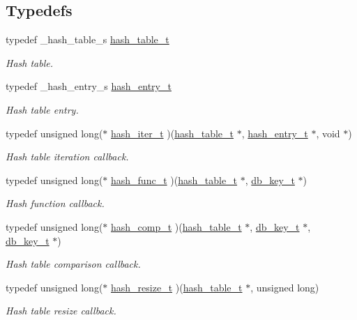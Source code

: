 \subsection*{Typedefs}
\begin{CompactItemize}
\item 
typedef \_\-hash\_\-table\_\-s \hyperlink{group__dbprim__hash_a0}{hash\_\-table\_\-t}
\begin{CompactList}\small\item\em Hash table.\item\end{CompactList}\item 
typedef \_\-hash\_\-entry\_\-s \hyperlink{group__dbprim__hash_a1}{hash\_\-entry\_\-t}
\begin{CompactList}\small\item\em Hash table entry.\item\end{CompactList}\item 
typedef unsigned long($\ast$ \hyperlink{group__dbprim__hash_a2}{hash\_\-iter\_\-t} )(\hyperlink{group__dbprim__hash_a0}{hash\_\-table\_\-t} $\ast$, \hyperlink{group__dbprim__hash_a1}{hash\_\-entry\_\-t} $\ast$, void $\ast$)
\begin{CompactList}\small\item\em Hash table iteration callback.\item\end{CompactList}\item 
typedef unsigned long($\ast$ \hyperlink{group__dbprim__hash_a3}{hash\_\-func\_\-t} )(\hyperlink{group__dbprim__hash_a0}{hash\_\-table\_\-t} $\ast$, \hyperlink{group__dbprim_a0}{db\_\-key\_\-t} $\ast$)
\begin{CompactList}\small\item\em Hash function callback.\item\end{CompactList}\item 
typedef unsigned long($\ast$ \hyperlink{group__dbprim__hash_a4}{hash\_\-comp\_\-t} )(\hyperlink{group__dbprim__hash_a0}{hash\_\-table\_\-t} $\ast$, \hyperlink{group__dbprim_a0}{db\_\-key\_\-t} $\ast$, \hyperlink{group__dbprim_a0}{db\_\-key\_\-t} $\ast$)
\begin{CompactList}\small\item\em Hash table comparison callback.\item\end{CompactList}\item 
typedef unsigned long($\ast$ \hyperlink{group__dbprim__hash_a5}{hash\_\-resize\_\-t} )(\hyperlink{group__dbprim__hash_a0}{hash\_\-table\_\-t} $\ast$, unsigned long)
\begin{CompactList}\small\item\em Hash table resize callback.\item\end{CompactList}\end{CompactItemize}

